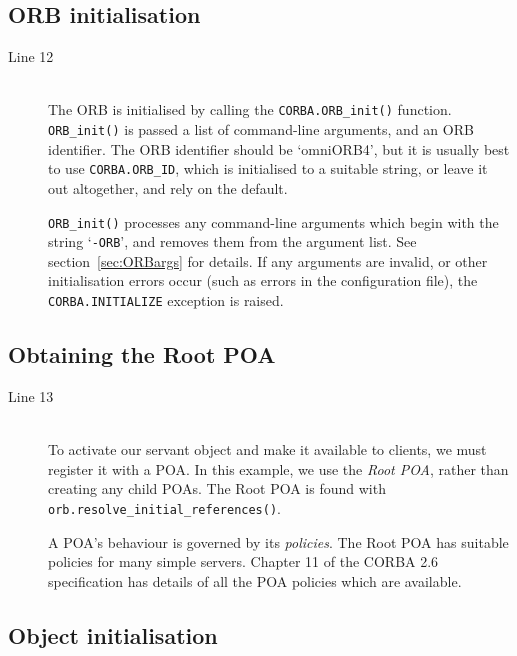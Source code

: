 \documentclass[11pt,twoside,a4paper]{book}
\newcommand{\code}[1]{\texttt{#1}}
\newcommand{\op}[1]{\texttt{#1()}}
\newcommand{\cmdline}[1]{\texttt{#1}}
\newcommand{\term}[1]{\textit{#1}}
\newcommand{\dsc}{\discretionary{}{}{}}
\begin{document}
\subsection{ORB initialisation}

\begin{description}

\item[Line 12]\mbox{}\\
%
The ORB is initialised by calling the \op{CORBA.ORB\_init} function.
\op{ORB\_\dsc{}init} is passed a list of command-line arguments, and
an ORB identifier. The ORB identifier should be `omniORB4', but it is
usually best to use \code{CORBA.ORB\_ID}, which is initialised to a
suitable string, or leave it out altogether, and rely on the default.

\op{ORB\_init} processes any command-line arguments which begin with
the string `\cmdline{-ORB}', and removes them from the argument
list. See section~\ref{sec:ORBargs} for details. If any arguments are
invalid, or other initialisation errors occur (such as errors in the
configuration file), the \code{CORBA.INITIALIZE} exception is raised.

\end{description}

\subsection{Obtaining the Root POA}

\begin{description}

\item[Line 13]\mbox{}\\
%
To activate our servant object and make it available to clients, we
must register it with a POA. In this example, we use the \term{Root
POA}, rather than creating any child POAs. The Root POA is found with
\op{orb.resolve\_initial\_\dsc{}references}.

A POA's behaviour is governed by its \term{policies}. The Root POA has
suitable policies for many simple servers. Chapter 11 of the CORBA 2.6
specification \cite{corba26-spec} has details of all the POA policies
which are available.

\end{description}


\subsection{Object initialisation}
\end{document}
